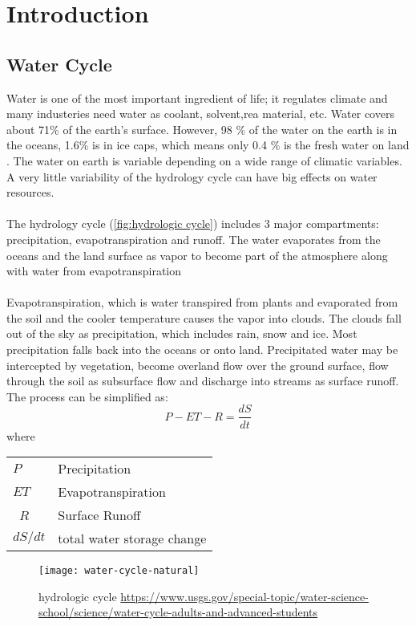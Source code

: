 \chapter{Introduction}
\section{Water Cycle}
Water is one of the most important ingredient of life; it regulates climate and many industeries need water as coolant, solvent,rea material, etc. Water covers about 71\% of the earth's surface. However, 98 \% of the water on the earth is in the oceans, 1.6\% is in ice caps, which means only 0.4 \% is the fresh water on land \cite{gleick1993water}. The water on earth is variable depending on a wide range of climatic variables. A very little variability of the hydrology cycle can have big effects on water resources. \cite{evans1996effects}\\\\
The hydrology cycle (\autoref{fig:hydrologic cycle}) includes 3 major compartments: precipitation, evapotranspiration and runoff. The water evaporates from the oceans and the land surface as vapor to become part of the atmosphere along with water from evapotranspiration\\\\
Evapotranspiration, which is water transpired from plants and evaporated from the soil and the cooler temperature causes the vapor into clouds. The clouds fall out of the sky as precipitation, which includes rain, snow and ice. Most precipitation falls back into the oceans or onto land. Precipitated water may be intercepted by vegetation, become overland flow over the ground surface, flow through the soil as subsurface flow and discharge into streams as surface runoff. The process can be simplified as:
\begin{equation}\label{equa:waterbalence}
	 P - ET - R = \frac{dS}{dt}
\end{equation}
where
\begin{table}[htbp]
	\begin{tabular}{ll}
		$P$   & Precipitation    \\ 
		$ET$    & Evapotranspiration \\ \
		$R$     & Surface Runoff \\ 
		$dS / dt$ & total water storage change \\ 
	\end{tabular}
\end{table}
\begin{figure}[htbp]
	\centering
	\texttt{[image: water-cycle-natural]} %
	\caption{hydrologic cycle \url{https://www.usgs.gov/special-topic/water-science-school/science/water-cycle-adults-and-advanced-students}} 
	\label{fig:hydrologic cycle}
\end{figure}
